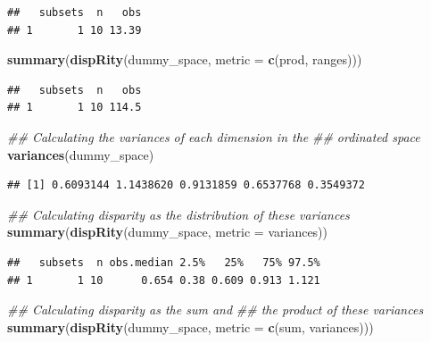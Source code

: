 \documentclass[
]{book}
\newenvironment{Shaded}{\begin{snugshade}}{\end{snugshade}}
\newcommand{\CommentTok}[1]{\textcolor[rgb]{0.56,0.35,0.01}{\textit{#1}}}
\newcommand{\DataTypeTok}[1]{\textcolor[rgb]{0.13,0.29,0.53}{#1}}
\newcommand{\KeywordTok}[1]{\textcolor[rgb]{0.13,0.29,0.53}{\textbf{#1}}}
\newcommand{\NormalTok}[1]{#1}
\begin{document}
\begin{verbatim}
##   subsets  n   obs
## 1       1 10 13.39
\end{verbatim}

\begin{Shaded}
\begin{Highlighting}[]
\KeywordTok{summary}\NormalTok{(}\KeywordTok{dispRity}\NormalTok{(dummy\_space, }\DataTypeTok{metric =} \KeywordTok{c}\NormalTok{(prod, ranges)))}
\end{Highlighting}
\end{Shaded}

\begin{verbatim}
##   subsets  n   obs
## 1       1 10 114.5
\end{verbatim}

\begin{Shaded}
\begin{Highlighting}[]
\CommentTok{\#\# Calculating the variances of each dimension in the}
\CommentTok{\#\# ordinated space}
\KeywordTok{variances}\NormalTok{(dummy\_space)}
\end{Highlighting}
\end{Shaded}

\begin{verbatim}
## [1] 0.6093144 1.1438620 0.9131859 0.6537768 0.3549372
\end{verbatim}

\begin{Shaded}
\begin{Highlighting}[]
\CommentTok{\#\# Calculating disparity as the distribution of these variances}
\KeywordTok{summary}\NormalTok{(}\KeywordTok{dispRity}\NormalTok{(dummy\_space, }\DataTypeTok{metric =}\NormalTok{ variances))}
\end{Highlighting}
\end{Shaded}

\begin{verbatim}
##   subsets  n obs.median 2.5%   25%   75% 97.5%
## 1       1 10      0.654 0.38 0.609 0.913 1.121
\end{verbatim}

\begin{Shaded}
\begin{Highlighting}[]
\CommentTok{\#\# Calculating disparity as the sum and}
\CommentTok{\#\# the product of these variances}
\KeywordTok{summary}\NormalTok{(}\KeywordTok{dispRity}\NormalTok{(dummy\_space, }\DataTypeTok{metric =} \KeywordTok{c}\NormalTok{(sum, variances)))}
\end{Highlighting}
\end{Shaded}
\end{document}
